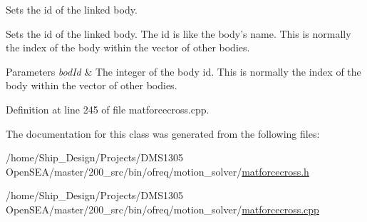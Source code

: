 Sets the id of the linked body. 

Sets the id of the linked body. The id is like the body's name. This is normally the index of the body within the vector of other bodies. 
\begin{DoxyParams}{Parameters}
{\em bod\-Id} & The integer of the body id. This is normally the index of the body within the vector of other bodies. \\
\hline
\end{DoxyParams}


Definition at line 245 of file matforcecross.\-cpp.



The documentation for this class was generated from the following files\-:\begin{DoxyCompactItemize}
\item 
/home/\-Ship\-\_\-\-Design/\-Projects/\-D\-M\-S1305 Open\-S\-E\-A/master/200\-\_\-src/bin/ofreq/motion\-\_\-solver/\hyperlink{matforcecross_8h}{matforcecross.\-h}\item 
/home/\-Ship\-\_\-\-Design/\-Projects/\-D\-M\-S1305 Open\-S\-E\-A/master/200\-\_\-src/bin/ofreq/motion\-\_\-solver/\hyperlink{matforcecross_8cpp}{matforcecross.\-cpp}\end{DoxyCompactItemize}

